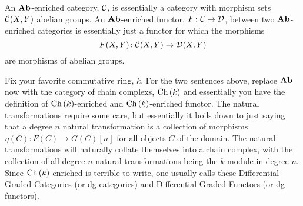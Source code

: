 \documentclass[reqno, 12pt]{amsart}
\begin{document}
\begin{exercise}
  An $\operatorname{\bf Ab}$-enriched category, $\mathcal{C}$, is essentially a category with morphism sets $\mathcal{C}(X,Y)$ abelian groups.
  An $\operatorname{\bf Ab}$-enriched functor, $F \colon \mathcal{C} \to \mathcal{D}$, between two $\operatorname{\bf Ab}$-enriched categories is essentially just a functor for which the morphisms
  $$F(X,Y) \colon \mathcal{C}(X,Y) \to \mathcal{D}(X,Y)$$
  are morphisms of abelian groups.

  Fix your favorite commutative ring, $k$.
  For the two sentences above, replace $\operatorname{\bf Ab}$ now with the category of chain complexs, $\operatorname{Ch}\left(k\right)$ and essentially you have the definition of $\operatorname{Ch}\left(k\right)$-enriched and $\operatorname{Ch}\left(k\right)$-enriched functor.
  The natural transformations require some care, but essentially it boils down to just saying that a degree $n$ natural transformation is a collection of morphisms $\eta(C) \colon F(C) \to G(C)[n]$ for all objects $C$ of the domain.
  The natural transformations will naturally collate themselves into a chain complex, with the collection of all degree $n$ natural transformations being the $k$-module in degree $n$.
  Since $\operatorname{Ch}\left(k\right)$-enriched is terrible to write, one usually calls these Differential Graded Categories (or dg-categories) and Differential Graded Functors (or dg-functors).


\end{exercise}
\end{document}
